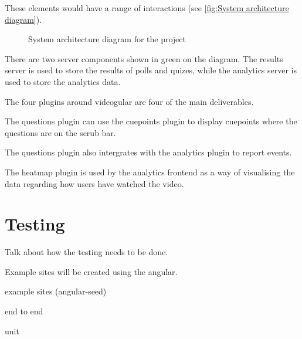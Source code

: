 These elements would have a range of interactions (see \autoref{fig:System architecture diagram}).

\begin{figure}[h!]
\centering

\caption{System architecture diagram for the project \label{fig:System architecture diagram}}
\end{figure}




There are two server components shown in green on the diagram. The results server is used to store the results of polls and quizes, while the analytics server is used to store the analytics data.

The four plugins around videogular are four of the main deliverables.

The questions plugin can use the cuepoints plugin to display cuepoints where the questions are on the scrub bar.

The questions plugin also intergrates with the analytics plugin to report events.

The heatmap plugin is used by the analytics frontend as a way of visualising the data regarding how users have watched the video.

\section{Testing}
\label{Section:Overall_Testing}

Talk about how the testing needs to be done.

Example sites will be created using the angular.

example sites (angular-seed)

end to end

unit

